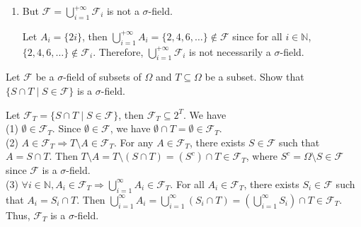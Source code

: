 \documentclass[a4paper, justified]{tufte-handout}
\begin{document}
\begin{solution}
\begin{enumerate}[1.]

      \item But $\mathcal{F} = \bigcup_{i = 1}^{+\infty} \mathcal{F}_i$ is not a $\sigma$-field. 
      
      Let $A_i = \{2i\}$, then $\bigcup_{i=1}^{+\infty} A_i = \{2, 4, 6, \ldots\} \notin \mathcal{F}$ since for all $i \in \mathbb{N}$, $\{2, 4, 6, \ldots\} \notin \mathcal{F}_i$. Therefore, \(\bigcup_{i=1}^{+\infty} \mathcal{F}_i\) is not necessarily a $\sigma$-field. 
    \end{enumerate}
\end{solution}

\begin{problem}[Projection]
  Let \(\mathcal{F}\) be a \(\sigma\)-field of subsets of \(\Omega\) and \(T \subseteq \Omega\) be a subset. Show that \(\{S \cap T \mid S \in \mathcal{F}\}\) is a \(\sigma\)-field.
\end{problem}

\begin{solution}
  Let $\mathcal{F}_T = \{S \cap T \mid S \in \mathcal{F}\}$, then $\mathcal{F}_T \subseteq 2^T$. We have\\
  (1) $\emptyset \in \mathcal{F}_T$. Since $\emptyset \in \mathcal{F}$, we have $\emptyset \cap T = \emptyset \in \mathcal{F}_T$.\\
  (2) $A \in \mathcal{F}_T \Rightarrow T \setminus A \in \mathcal{F}_T$. For any $A \in \mathcal{F}_T$, there exists $S \in \mathcal{F}$ such that $A = S \cap T$. Then $T \setminus A = T \setminus (S \cap T) = (S^c) \cap T \in \mathcal{F}_T$, where $S^c = \Omega \setminus S \in \mathcal{F}$ since $\mathcal{F}$ is a $\sigma$-field.\\
  (3) $\forall i \in \mathbb{N}, A_i \in \mathcal{F}_T \Rightarrow \bigcup_{i=1}^\infty A_i \in \mathcal{F}_T$. For all $A_i \in \mathcal{F}_T$, there exists $S_i \in \mathcal{F}$ such that $A_i = S_i \cap T$. Then $\bigcup_{i=1}^\infty A_i = \bigcup_{i=1}^\infty \left(S_i \cap T\right) = (\bigcup_{i=1}^\infty S_i) \cap T \in \mathcal{F}_T$.\\
  Thus, $\mathcal{F}_T$ is a $\sigma$-field.
\end{solution}
\end{document}
